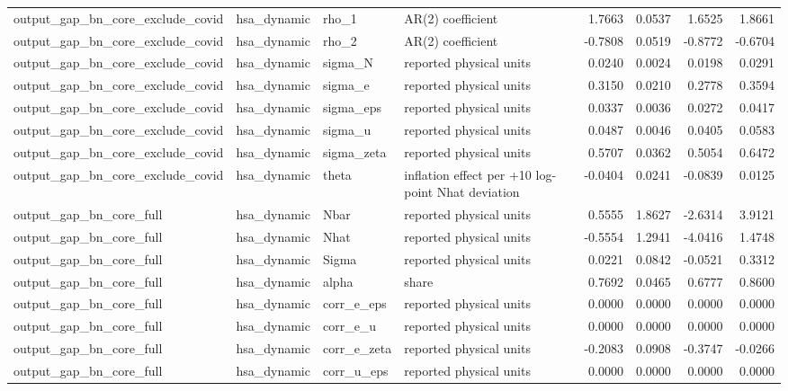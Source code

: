 \begin{tabular}{llllrrrr}
output\_gap\_bn\_core\_exclude\_covid & hsa\_dynamic & rho\_1 & AR(2) coefficient & 1.7663 & 0.0537 & 1.6525 & 1.8661 \\
output\_gap\_bn\_core\_exclude\_covid & hsa\_dynamic & rho\_2 & AR(2) coefficient & -0.7808 & 0.0519 & -0.8772 & -0.6704 \\
output\_gap\_bn\_core\_exclude\_covid & hsa\_dynamic & sigma\_N & reported physical units & 0.0240 & 0.0024 & 0.0198 & 0.0291 \\
output\_gap\_bn\_core\_exclude\_covid & hsa\_dynamic & sigma\_e & reported physical units & 0.3150 & 0.0210 & 0.2778 & 0.3594 \\
output\_gap\_bn\_core\_exclude\_covid & hsa\_dynamic & sigma\_eps & reported physical units & 0.0337 & 0.0036 & 0.0272 & 0.0417 \\
output\_gap\_bn\_core\_exclude\_covid & hsa\_dynamic & sigma\_u & reported physical units & 0.0487 & 0.0046 & 0.0405 & 0.0583 \\
output\_gap\_bn\_core\_exclude\_covid & hsa\_dynamic & sigma\_zeta & reported physical units & 0.5707 & 0.0362 & 0.5054 & 0.6472 \\
output\_gap\_bn\_core\_exclude\_covid & hsa\_dynamic & theta & inflation effect per +10 log-point Nhat deviation & -0.0404 & 0.0241 & -0.0839 & 0.0125 \\
output\_gap\_bn\_core\_full & hsa\_dynamic & Nbar & reported physical units & 0.5555 & 1.8627 & -2.6314 & 3.9121 \\
output\_gap\_bn\_core\_full & hsa\_dynamic & Nhat & reported physical units & -0.5554 & 1.2941 & -4.0416 & 1.4748 \\
output\_gap\_bn\_core\_full & hsa\_dynamic & Sigma & reported physical units & 0.0221 & 0.0842 & -0.0521 & 0.3312 \\
output\_gap\_bn\_core\_full & hsa\_dynamic & alpha & share & 0.7692 & 0.0465 & 0.6777 & 0.8600 \\
output\_gap\_bn\_core\_full & hsa\_dynamic & corr\_e\_eps & reported physical units & 0.0000 & 0.0000 & 0.0000 & 0.0000 \\
output\_gap\_bn\_core\_full & hsa\_dynamic & corr\_e\_u & reported physical units & 0.0000 & 0.0000 & 0.0000 & 0.0000 \\
output\_gap\_bn\_core\_full & hsa\_dynamic & corr\_e\_zeta & reported physical units & -0.2083 & 0.0908 & -0.3747 & -0.0266 \\
output\_gap\_bn\_core\_full & hsa\_dynamic & corr\_u\_eps & reported physical units & 0.0000 & 0.0000 & 0.0000 & 0.0000 \\

\end{tabular}
